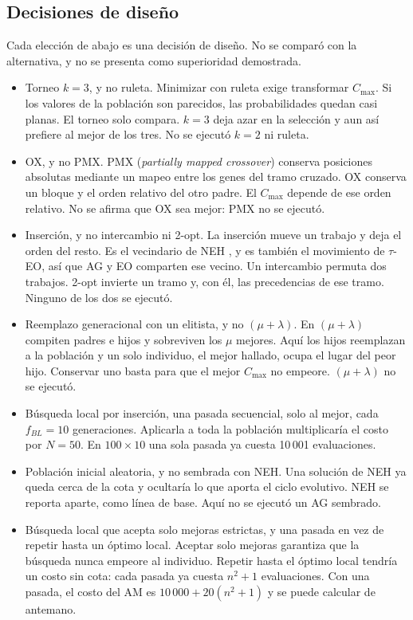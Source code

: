 \documentclass[journal]{IEEEtran}
\begin{document}
\subsection{Decisiones de diseño}
Cada elección de abajo es una decisión de diseño. No se comparó con la alternativa, y no se presenta como superioridad demostrada.
\begin{itemize}
  \item Torneo $k=3$, y no ruleta. Minimizar con ruleta exige transformar $C_{\max}$. Si los valores de la población son parecidos, las probabilidades quedan casi planas. El torneo solo compara. $k=3$ deja azar en la selección y aun así prefiere al mejor de los tres. No se ejecutó $k=2$ ni ruleta.
  \item OX, y no PMX. PMX (\textit{partially mapped crossover}) conserva posiciones absolutas mediante un mapeo entre los genes del tramo cruzado. OX conserva un bloque y el orden relativo del otro padre. El $C_{\max}$ depende de ese orden relativo. No se afirma que OX sea mejor: PMX no se ejecutó.
  \item Inserción, y no intercambio ni 2-opt. La inserción mueve un trabajo y deja el orden del resto. Es el vecindario de NEH \cite{nawaz_heuristic_1983}, y es también el movimiento de $\tau$-EO, así que AG y EO comparten ese vecino. Un intercambio permuta dos trabajos. 2-opt invierte un tramo y, con él, las precedencias de ese tramo. Ninguno de los dos se ejecutó.
  \item Reemplazo generacional con un elitista, y no $(\mu+\lambda)$. En $(\mu+\lambda)$ compiten padres e hijos y sobreviven los $\mu$ mejores. Aquí los hijos reemplazan a la población y un solo individuo, el mejor hallado, ocupa el lugar del peor hijo. Conservar uno basta para que el mejor $C_{\max}$ no empeore. $(\mu+\lambda)$ no se ejecutó.
  \item Búsqueda local por inserción, una pasada secuencial, solo al mejor, cada $f_{BL}=10$ generaciones. Aplicarla a toda la población multiplicaría el costo por $N=50$. En $100\times10$ una sola pasada ya cuesta 10\,001 evaluaciones.
  \item Población inicial aleatoria, y no sembrada con NEH. Una solución de NEH ya queda cerca de la cota y ocultaría lo que aporta el ciclo evolutivo. NEH se reporta aparte, como línea de base. Aquí no se ejecutó un AG sembrado.
  \item Búsqueda local que acepta solo mejoras estrictas, y una pasada en vez de repetir hasta un óptimo local. Aceptar solo mejoras garantiza que la búsqueda nunca empeore al individuo. Repetir hasta el óptimo local tendría un costo sin cota: cada pasada ya cuesta $n^2+1$ evaluaciones. Con una pasada, el costo del AM es $10\,000+20(n^2+1)$ y se puede calcular de antemano.

\end{itemize}
\end{document}
